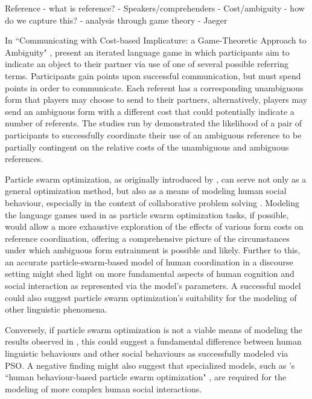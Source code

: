 \documentclass[12pt]{article}
\begin{document}
Reference - what is reference? - Speakers/comprehenders - Cost/ambiguity - how do we capture this? - analysis through game theory - Jaeger

In ``Communicating with Cost-based Implicature: a Game-Theoretic Approach to Ambiguity" \citeyearpar{rohde2012}, \citeauthor{rohde2012} present an iterated language game in which participants aim to indicate an object to their partner via use of one of several possible referring terms. Participants gain points upon successful communication, but must spend points in order to communicate. Each referent has a corresponding unambiguous form that players may choose to send to
their partners, alternatively, players may send an ambiguous form with a different cost that could potentially indicate a number of referents. The studies run by \citeauthor{rohde2012} demonstrated the likelihood of a pair of participants to successfully coordinate their use of an ambiguous reference to be partially contingent on the relative costs of the unambiguous and ambiguous references.

Particle swarm optimization, as originally introduced by \citet*{kennedy1995}, can serve not only as a general optimization method, but also as a means of modeling human social behaviour, especially in the context of collaborative problem solving \citep{kennedy1997}. Modeling the language games used in \citeauthor{rohde2012} as particle swarm optimization tasks, if possible, would allow a more exhaustive exploration of the effects of various form costs on reference coordination, offering a comprehensive picture of the circumstances under which ambiguous form entrainment is possible and likely. Further to this, an accurate particle-swarm-based model of human coordination in a discourse setting might shed light on more fundamental aspects of human cognition and social interaction as represented via the model's parameters. A successful model could also suggest particle swarm optimization's suitability for the modeling of other linguistic phenomena. 

Conversely, if particle swarm optimization is not a viable means of modeling the results observed in \citeauthor{rohde2012}, this could suggest a fundamental difference between human linguistic behaviours and other social behaviours as successfully modeled via PSO. A negative finding might also suggest that specialized models, such as \citeauthor{liu2014}'s ``human behaviour-based particle swarm optimization" \citeyearpar{liu2014}, are required for the modeling of more complex human social interactions.
\end{document}
